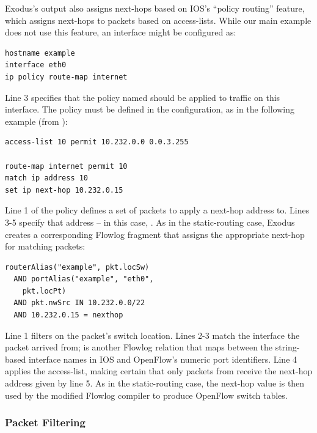 Exodus's output also assigns next-hops based on IOS's ``policy
routing'' feature, which assigns next-hops to packets
based on access-lists. While our main example does not
use this feature, an interface might be configured as:

\begin{lstlisting}[label=lst:policy-route-decl,language=IOS]
hostname example
interface eth0
ip policy route-map internet
\end{lstlisting}

\noindent Line 3 specifies that the policy named  should
be applied to traffic on this interface. The  policy
must be defined in the configuration, as in the following example
(from \cite{n++:lisa-margrave-firewalls}):

\noindent\begin{minipage}{\linewidth}
\begin{lstlisting}[label=lst:policy-route,language=IOS]
access-list 10 permit 10.232.0.0 0.0.3.255

route-map internet permit 10
match ip address 10
set ip next-hop 10.232.0.15
\end{lstlisting}
\end{minipage}

\noindent
Line 1 of the policy defines a set of packets to apply a next-hop
address to. Lines 3-5 specify that address -- in this case,
.  As in the static-routing case, Exodus creates a
corresponding Flowlog fragment that assigns the appropriate next-hop
for matching packets:
\begin{lstlisting}[label=lst:policy-routing-flowlog,language=Flowlog]
routerAlias("example", pkt.locSw)
  AND portAlias("example", "eth0",
    pkt.locPt) 
  AND pkt.nwSrc IN 10.232.0.0/22
  AND 10.232.0.15 = nexthop
\end{lstlisting}

\noindent Line 1 filters on the packet's switch location. Lines 2-3
match the interface the packet arrived from;
 is another Flowlog relation that maps between the
string-based interface names in IOS and OpenFlow's numeric port
identifiers. Line 4 applies the access-list, making certain that only
packets from  receive the next-hop address given
by line 5. As in the static-routing case, the next-hop value is then
used by the modified Flowlog compiler to produce OpenFlow switch
tables.

\subsubsection{Packet Filtering}
\label{sec:filtering}

